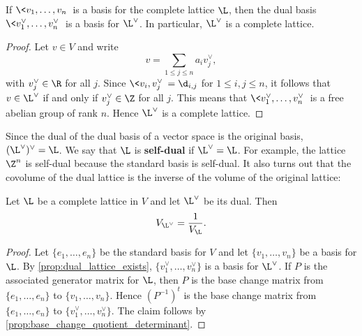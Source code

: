     \begin{proposition}\label{prop:dual_lattice_exists}
      If $\<v_{1},\ldots,v_{n}\>$ is a basis for the complete lattice $\L$, then the dual basis $\<v_{1}^{\vee},\ldots,v_{n}^{\vee}\>$ is a basis for $\L^{\vee}$. In particular, $\L^{\vee}$ is a complete lattice.
    \end{proposition}
    \begin{proof}
      Let $v \in V$ and write
      \[
        v = \sum_{1 \le j \le n}a_{i}v_{j}^{\vee},
      \]
      with $v_{j}^{\vee} \in \R$ for all $j$. Since $\<v_{i},v_{j}^{\vee}\> = \d_{i,j}$ for $1 \le i,j \le n$, it follows that $v \in \L^{\vee}$ if and only if $v_{j}^{\vee} \in \Z$ for all $j$. This means that $\<v_{1}^{\vee},\ldots,v_{n}^{\vee}\>$ is a free abelian group of rank $n$. Hence $\L^{\vee}$ is a complete lattice.
    \end{proof}

    Since the dual of the dual basis of a vector space is the original basis, $(\L^{\vee})^{\vee} = \L$. We say that $\L$ is \textbf{self-dual} if $\L^{\vee} = \L$. For example, the lattice $\Z^{n}$ is self-dual because the standard basis is self-dual. It also turns out that the covolume of the dual lattice is the inverse of the volume of the original lattice:

    \begin{proposition}\label{prop:covolume_of_dual_is_inverse}
      Let $\L$ be a complete lattice in $V$ and let $\L^{\vee}$ be its dual. Then
      \[
        V_{\L^{\vee}} = \frac{1}{V_{\L}}.
      \]
    \end{proposition}
    \begin{proof}
      Let $\{e_{1},\ldots,e_{n}\}$ be the standard basis for $V$ and let $\{v_{1},\ldots,v_{n}\}$ be a basis for $\L$. By \cref{prop:dual_lattice_exists}, $\{v_{1}^{\vee},\ldots,v_{n}^{\vee}\}$ is a basis for $\L^{\vee}$. If $P$ is the associated generator matrix for $\L$, then $P$ is the base change matrix from $\{e_{1},\ldots,e_{n}\}$ to $\{v_{1},\ldots,v_{n}\}$. Hence $(P^{-1})^{t}$ is the base change matrix from $\{e_{1},\ldots,e_{n}\}$ to $\{v_{1}^{\vee},\ldots,v_{n}^{\vee}\}$. The claim follows by \cref{prop:base_change_quotient_determinant}.
    \end{proof}
    
